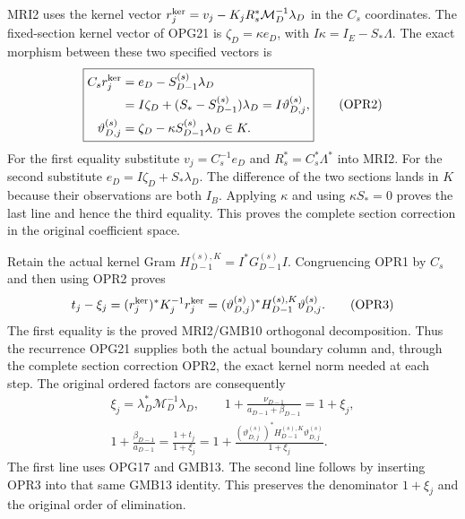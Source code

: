 \documentclass[11pt,a4paper]{article}
\begin{document}
MRI2 uses the kernel vector
$r_j^{\rm ker}=v_j-K_jR_s^*\mathcal M_D^{-1}\lambda_D$
in the $C_s$ coordinates. The fixed-section kernel vector of
OPG21 is $\zeta_D=\kappa e_D$, with $I\kappa=I_E-S_*\Lambda$.
The exact morphism between these two specified vectors is
\[
\boxed{\begin{aligned}
 C_s r_j^{\rm ker}
   &=e_D-S_{D-1}^{(s)}\lambda_D\\
   &=I\zeta_D+(S_*-S_{D-1}^{(s)})\lambda_D
    =I\vartheta_{D,j}^{(s)},\\
 \vartheta_{D,j}^{(s)}
   &=\zeta_D-\kappa S_{D-1}^{(s)}\lambda_D\in K.
\end{aligned}}\tag{OPR2}
\]
For the first equality substitute $v_j=C_s^{-1}e_D$ and
$R_s^*=C_s^*\Lambda^*$ into MRI2. For the second substitute
$e_D=I\zeta_D+S_*\lambda_D$. The difference of the two
sections lands in $K$ because their observations are both $I_B$.
Applying $\kappa$ and using $\kappa S_*=0$ proves the last
line and hence the third equality. This proves the complete
section correction in the original coefficient space.

Retain the actual kernel Gram
$H_{D-1}^{(s),K}=I^*G_{D-1}^{(s)}I$. Congruencing OPR1 by
$C_s$ and then using OPR2 proves
\[
 t_j-\xi_j
 = (r_j^{\rm ker})^*K_j^{-1}r_j^{\rm ker}
 = (\vartheta_{D,j}^{(s)})^*
                    H_{D-1}^{(s),K}\vartheta_{D,j}^{(s)}.
 \tag{OPR3}
\]
The first equality is the proved MRI2/GMB10 orthogonal
decomposition. Thus the recurrence OPG21 supplies both the
actual boundary column and, through the complete section
correction OPR2, the exact kernel norm needed at each step.
The original ordered factors are consequently
\[
\begin{gathered}
 \xi_j=\lambda_D^*\mathcal M_D^{-1}\lambda_D,\qquad
 1+\frac{\nu_{D-1}}{a_{D-1}+\beta_{D-1}}=1+\xi_j,\\
 1+\frac{\beta_{D-1}}{a_{D-1}}
 =\frac{1+t_j}{1+\xi_j}
 =1+\frac{(\vartheta_{D,j}^{(s)})^*
                  H_{D-1}^{(s),K}\vartheta_{D,j}^{(s)}}{1+\xi_j}.
\end{gathered}\tag{OPR4}
\]
The first line uses OPG17 and GMB13. The second line follows
by inserting OPR3 into that same GMB13 identity. This preserves
the denominator $1+\xi_j$ and the original order of elimination.
\end{document}
